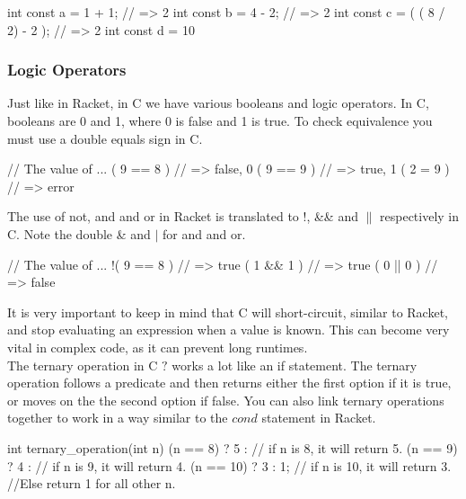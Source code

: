 
\begin{code}[C]
int const a = 1 + 1; // => 2
int const b = 4 - 2; // => 2
int const c = ( ( 8 / 2) - 2 ); // => 2
int const d = 10 %
\end{code}


\subsubsection*{Logic Operators}

Just like in Racket, in C we have various booleans and logic operators.  In C, booleans are 0 and 1, where 0 is false and 1 is true.  To check equivalence you must use a double equals sign in C.

\begin{code}[C]
// The value of ...
( 9 == 8 ) // => false, 0
( 9 == 9 ) // => true, 1
( 2 = 9 ) // => error
\end{code}

The use of not, and and or in Racket is translated to !, \&\& and $\parallel$ respectively in C. Note the double \& and $\mid$ for and and or.\\

\begin{code}[C]
// The value of ...
!( 9 == 8 ) // => true
( 1 && 1 ) // => true
( 0 || 0 ) // => false
\end{code}

It is very important to keep in mind that C will short-circuit, similar to Racket, and stop evaluating an expression when a value is known. This can become very vital in complex code, as it can prevent long runtimes.\\

The ternary operation in C $?$ works a lot like an if statement.  The ternary operation follows a predicate and then returns either the first option if it is true, or moves on the the second option if false.  You can also link ternary operations together to work in a way similar to the $cond$ statement in Racket.\\

\begin{code}[C]
int ternary_operation(int n)
{
	(n == 8) ? 5 : // if n is 8, it will return 5.
	(n == 9) ? 4 : // if n is 9, it will return 4.
	(n == 10) ? 3 : 1; // if n is 10, it will return 3. 
	//Else return 1 for all other n.
}
\end{code}

